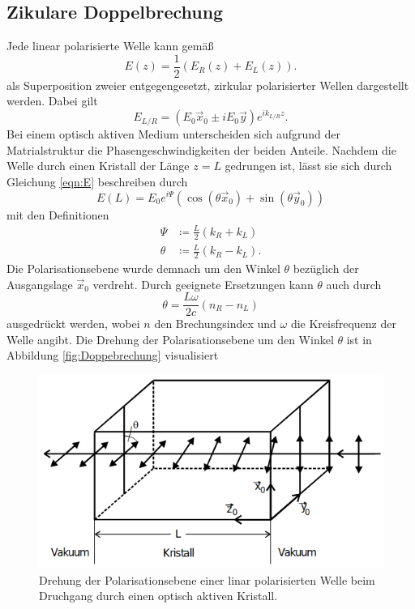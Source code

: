 \subsection{Zikulare Doppelbrechung}
Jede linear polarisierte Welle kann gemäß
\begin{equation}
    E(z)=\frac{1}{2}(E_R(z)+E_L(z)) . 
    \label{eqn:E}   
\end{equation}
als Superposition zweier entgegengesetzt, zirkular polarisierter Wellen dargestellt werden. Dabei gilt 
\begin{equation*}
    E_{L/R}=(E_0\vec{x}_0\pm iE_0\vec{y})e^{ik_{L/R}z} .
\end{equation*}
Bei einem optisch aktiven Medium unterscheiden sich aufgrund der Matrialstruktur die Phasengeschwindigkeiten der beiden Anteile. 
Nachdem die Welle durch einen Kristall der Länge $z=L$ gedrungen ist, lässt sie sich durch Gleichung \ref{eqn:E} beschreiben durch
\begin{equation*}
    E(L)=E_0e^{i\Psi}(\cos{(\theta\vec{x}_0)}+\sin{(\theta\vec{y}_0)})
\end{equation*}
mit den Definitionen
\begin{align*}
    \Psi  &\coloneqq \frac{L}{2}(k_R+k_L)\\
    \theta&\coloneqq \frac{L}{2}(k_R-k_L) .
\end{align*}
Die Polarisationsebene wurde demnach um den Winkel $\theta$ bezüglich der Ausgangslage $\vec{x}_0$ verdreht. Durch geeignete 
Ersetzungen kann $\theta$ auch durch 
\begin{equation*}
    \theta=\frac{L\omega}{2c}(n_R-n_L)
\end{equation*}
ausgedrückt werden, wobei $n$ den Brechungsindex und $\omega$ die Kreisfrequenz der Welle angibt. Die Drehung der Polarisationsebene
um den Winkel $\theta$ ist in Abbildung \ref{fig:Doppebrechung} visualisiert
\begin{figure}[H]
    \centering
    \includegraphics[scale=0.5]{pictures/Doppelbrechung.png}
    \caption{Drehung der Polarisationsebene einer linar polarisierten Welle beim Druchgang durch einen optisch aktiven Kristall.}
\end{figure}

